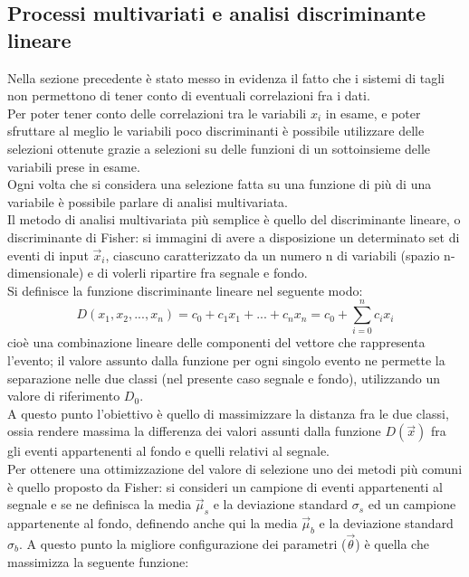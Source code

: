\newpage
\subsection{Processi multivariati e analisi discriminante lineare}
\label{metodi lineari e discriminante di Fisher}

Nella sezione precedente è stato messo in evidenza il fatto che i sistemi di tagli non permettono di tener conto di eventuali correlazioni fra i dati.\\
Per poter tener conto delle correlazioni tra le variabili $x_i$ in esame, e poter sfruttare al meglio le variabili poco discriminanti è possibile utilizzare delle selezioni ottenute grazie a selezioni su delle funzioni di un sottoinsieme delle variabili prese in esame. \\
Ogni volta che si considera una selezione fatta su una funzione di più di una variabile è possibile parlare di analisi multivariata.\\
Il metodo di analisi multivariata più semplice è quello del discriminante lineare, o discriminante di Fisher: si immagini di avere a disposizione un determinato set di eventi di input $\vec{x}_i$, ciascuno caratterizzato da un numero n di variabili (spazio n-dimensionale) e di volerli ripartire fra segnale e fondo.\\
Si definisce la funzione discriminante lineare nel seguente modo:
\begin{equation}
D(x_1 , x_2 , ... , x_n) = c_0 + c_1x_1 + ... +c_nx_n = c_0 + \sum_{i=0}^{n} c_ix_i 
\end{equation}
cioè una combinazione lineare delle componenti del vettore che rappresenta l'evento; il valore assunto dalla funzione per ogni singolo evento ne permette la separazione nelle due classi (nel presente caso segnale e fondo), utilizzando un valore di riferimento $D_0$. \\
A questo punto l'obiettivo è quello di massimizzare la distanza fra le due classi, ossia rendere massima la differenza dei valori assunti dalla funzione $D(\vec{x})$ fra gli eventi appartenenti al fondo e quelli relativi al segnale. \\
Per ottenere una ottimizzazione del valore di selezione uno dei metodi più comuni è quello proposto da Fisher: si consideri un campione di eventi appartenenti al segnale e se ne definisca la media $\vec\mu_s$ e la deviazione standard $\sigma_s$ ed un campione appartenente al fondo, definendo anche qui la media $\vec\mu_b$ e la deviazione standard $\sigma_b$. A questo punto la migliore configurazione dei parametri ($\vec{\theta}$) è quella che massimizza la seguente funzione: 
